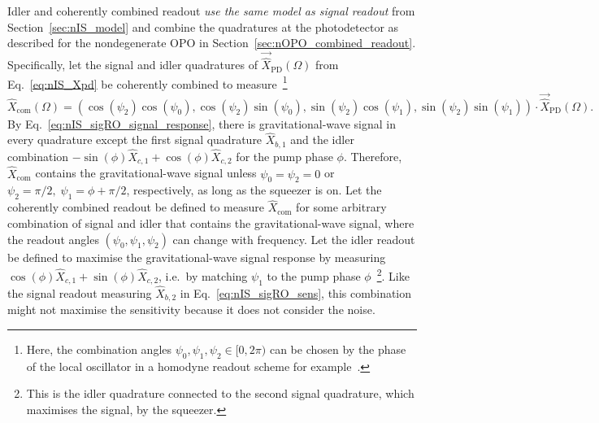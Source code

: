 Idler and coherently combined readout \emph{use the same model as signal readout} from Section~\ref{sec:nIS_model} and combine the quadratures at the photodetector as described for the nondegenerate OPO in Section~\ref{sec:nOPO_combined_readout}. Specifically, let the signal and idler quadratures of $\vec{\hat X}_\text{PD}(\Omega)$ from Eq.~\ref{eq:nIS_Xpd} be coherently combined to measure~\footnote{Here, the combination angles $\psi_0,\psi_1,\psi_2\in[0,2\pi)$ can be chosen by the phase of the local oscillator in a homodyne readout scheme for example~\cite{danilishinQuantumMeasurementTheory2012}.}
\begin{equation}\label{eq:Xcom_three_angles}
\hat X_\text{com}(\Omega)=\left(\cos(\psi_2)\cos(\psi_0) , \cos(\psi_2)\sin(\psi_0) , \sin(\psi_2)\cos(\psi_1) , \sin(\psi_2)\sin(\psi_1)\right)\cdot\vec{\hat X}_\text{PD}(\Omega).
\end{equation}
By Eq.~\ref{eq:nIS_sigRO_signal_response}, there is gravitational-wave signal in every quadrature except the first signal quadrature $\hat{X}_{b,1}$ and the idler combination $-\sin(\phi)\hat{X}_{c,1}+\cos(\phi)\hat{X}_{c,2}$ for the pump phase $\phi$. Therefore, $\hat{X}_\text{com}$ contains the gravitational-wave signal unless $\psi_0=\psi_2=0$ or $\psi_2=\pi/2,\;\psi_1=\phi+\pi/2$, respectively, as long as the squeezer is on. 
Let the coherently combined readout be defined to measure $\hat{X}_\text{com}$ for some arbitrary combination of signal and idler that contains the gravitational-wave signal, where the readout angles $(\psi_0,\psi_1,\psi_2)$ can change with frequency.
Let the idler readout be defined to maximise the gravitational-wave signal response by measuring $\cos(\phi)\hat{X}_{c,1}+\sin(\phi)\hat{X}_{c,2}$, i.e.\ by matching $\psi_1$ to the pump phase $\phi$~\footnote{This is the idler quadrature connected to the second signal quadrature, which maximises the signal, by the squeezer.}. Like the signal readout measuring $\hat{X}_{b,2}$ in Eq.~\ref{eq:nIS_sigRO_sens}, this combination might not maximise the sensitivity because it does not consider the noise. %
